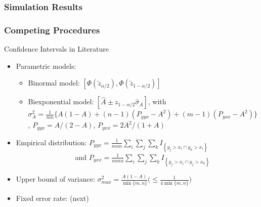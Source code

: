 \documentclass{beamer}
\begin{document}

\begin{frame}
\frametitle{Simulation Results}




\end{frame}



\begin{frame}
\frametitle{Competing Procedures}

Confidence Intervals in Literature
\begin{itemize}

    \item Parametric models:
    \begin{itemize}
        \item Binormal model: $[\Phi(\tilde{z}_{\alpha/2}), \Phi(\tilde{z}_{1-\alpha/2})]$
        \item Biexponential model: $[\hat{A} \pm  z_{1-\alpha/2} \hat{\sigma}_A]$, with \\
        $\sigma^2_A = \frac{1}{mn} \{ A(1 - A) + (n - 1)(P_{yyx} - A^2) + (m - 1)(P_{yxx} - A^2) \}$,
        $P_{yyx} = A/(2-A)$, $P_{yxx} = 2A^2/(1+A)$
    \end{itemize}

    \item Empirical distribution: $P_{yyx} = \frac{1}{mnn} \sum_i \sum_j \sum_k I_{\left\{ y_j > x_i \cap y_k > x_i \right\}}$ \\
    $\qquad\qquad\qquad\qquad$ and $P_{yxx} = \frac{1}{mmn} \sum_i \sum_j \sum_k I_{\left\{ y_j > x_i \cap y_j > x_k \right\}}$

    \item Upper bound of variance: $\sigma^2_{max} = \frac{A(1-A)}{\min\{ m, n \}} \big( \leq \frac{1}{4 \min\{ m, n \} } \big) $

    \item Fixed error rate: (next)

\end{itemize}

\end{frame}

\end{document}
